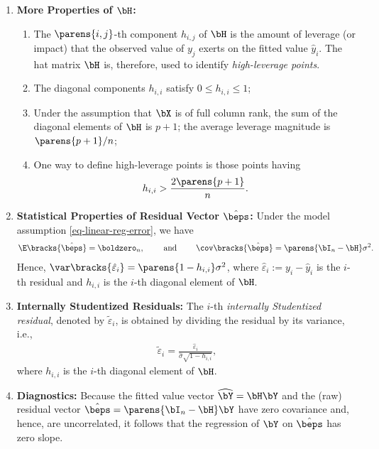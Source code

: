 \documentclass[12pt]{article}
\begin{document}
\begin{enumerate}[label=\textbf{\arabic*.}]
	\item \textbf{More Properties of $\bH$:} 
	\begin{enumerate}
		\item The $\parens{i,j}$-th component $h_{i,j}$ of $\bH$ is the amount of leverage (or impact) that the observed value of $y_j$ exerts on the fitted value $\hat{y}_i$. The hat matrix $\bH$ is, therefore, used to identify \emph{high-leverage points}. 
		\item The diagonal components $h_{i,i}$ satisfy $0 \le h_{i,i} \le 1$; 
		\item Under the assumption that $\bX$ is of full column rank, the sum of the diagonal elements of $\bH$ is $p+1$; the average leverage magnitude is $\parens{p+1}/n$; 
		\item One way to define high-leverage points is those points having 
		\begin{align*}
			h_{i,i} > \frac{2 \parens{p+1}}{n}. 
		\end{align*}
	\end{enumerate}
	
	\item \textbf{Statistical Properties of Residual Vector $\hat{\beps}$:} Under the model assumption \eqref{eq-linear-reg-error}, we have 
	\begin{align*}
		\E \bracks{\hat{\beps}} = \boldzero_n, \qquad \text{ and } \qquad \cov \bracks{\hat{\beps}} = \parens{\bI_n - \bH} \sigma^2. 
	\end{align*}
	Hence, $\var \bracks{\hat{\varepsilon}_i} = \parens{1 - h_{i,i}} \sigma^2$, where $\hat{\varepsilon}_i := y_i - \hat{y}_i$ is the $i$-th residual and $h_{i,i}$ is the $i$-th diagonal element of $\bH$. 
	
	\item \textbf{Internally Studentized Residuals:} The $i$-th \emph{internally Studentized residual}, denoted by $\tilde{\varepsilon}_i$, is obtained by dividing the residual by its variance, i.e., 
	\begin{align*}
		\tilde{\varepsilon}_i = \frac{\hat{\varepsilon}_i}{\hat{\sigma} \sqrt{1 - h_{i,i}}}, 
	\end{align*}
	where $h_{i,i}$ is the $i$-th diagonal element of $\bH$. 
	
	\item \textbf{Diagnostics:} Because the fitted value vector $\widehat{\bY} = \bH \bY$ and the (raw) residual vector $\hat{\beps} = \parens{\bI_n - \bH} \bY$ have zero covariance and, hence, are uncorrelated, it follows that the regression of $\bY$ on $\hat{\beps}$ has zero slope. 
	

\end{enumerate}
\end{document}
